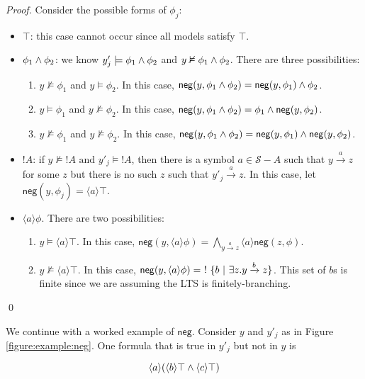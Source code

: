 \begin{proof}
Consider the possible forms of $\phi_j$:
\begin{itemize}
\item
$\top$: this case cannot occur since all models satisfy $\top$.
\item
$\phi_1 \land \phi_2$: we know $y'_j \models \phi_1 \land \phi_2$ and $y \nvDash \phi_1 \land \phi_2$. There are three possibilities:
\begin{enumerate}
\item
$y \nvDash \phi_1$ and $y \models \phi_2$. In this case, $\mathsf{neg}(y, \phi_1 \land \phi_2) = \mathsf{neg}(y, \phi_1) \land \phi_2$.
\item
$y \models \phi_1$ and $y \nvDash \phi_2$. In this case, $\mathsf{neg}(y, \phi_1 \land \phi_2) = \phi_1 \land \mathsf{neg}(y, \phi_2)$.
\item
$y \nvDash \phi_1$ and $y \nvDash \phi_2$. In this case, $\mathsf{neg}(y, \phi_1 \land \phi_2) =  \mathsf{neg}(y, \phi_1) \land \mathsf{neg}(y, \phi_2)$.
\end{enumerate}
\item
$!A$: if $y \nvDash !A \mbox{ and } y'_j \models !A$, then there is a symbol $a \in \mathcal{S}-A$ such that $y \xrightarrow{a} z$ for some $z$ but there is no such $z$ such that $y'_j \xrightarrow{a} z$. In this case, let $\mathsf{neg}(y, \phi_j) = \langle a \rangle \top$.
\item
$\langle a \rangle \phi$. There are two possibilities:
\begin{enumerate}
\item
$y \models \langle a \rangle \top$. In this case, $\mathsf{neg}(y, \langle a \rangle \phi) =  \bigwedge\limits_{y \xrightarrow{a} z}  \langle a \rangle \mathsf{neg}(z, \phi)$.
\item
$y \nvDash \langle a \rangle \top$. In this case, $\mathsf{neg}(y, \langle a \rangle \phi) = \ ! \  \{ b \ | \  \exists z. y \xrightarrow{b} z\}$. This set of $b$s is finite since we are assuming the LTS is finitely-branching.
\end{enumerate}
\end{itemize}
\qed
\end{proof}



\NI We continue with a worked example of $\mathsf{neg}$.  Consider
  $y$ and $y'_j$ as in Figure \ref{figure:example:neg}.  One formula
  that is true in $y'_j$ but not in $y$ is

\[
   \langle a \rangle (\langle b \rangle \top \land \langle c \rangle \top)
\]

